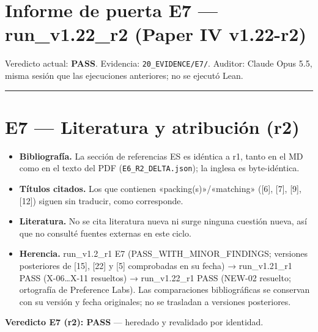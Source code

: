 \documentclass[
]{article}
\author{}
\date{}
\providecommand{\tightlist}{%
  \setlength{\itemsep}{0pt}\setlength{\parskip}{0pt}}
\begin{document}
\section{Informe de puerta E7 --- run\_v1.22\_r2 (Paper IV
v1.22-r2)}\label{informe-de-puerta-e7--run_v122_r2-paper-iv-v122-r2}

Veredicto actual: \textbf{PASS}. Evidencia: \texttt{20\_EVIDENCE/E7/}.
Auditor: Claude Opus 5.5, misma sesión que las ejecuciones anteriores;
no se ejecutó Lean.

\begin{center}\rule{0.5\linewidth}{0.5pt}\end{center}

\section{E7 --- Literatura y atribución
(r2)}\label{e7--literatura-y-atribuciuxf3n-r2}

\begin{itemize}
\tightlist
\item
  \textbf{Bibliografía.} La sección de referencias ES es idéntica a r1,
  tanto en el MD como en el texto del PDF (\texttt{E6\_R2\_DELTA.json});
  la inglesa es byte-idéntica.
\item
  \textbf{Títulos citados.} Los que contienen «packing(s)»/«matching»
  ({[}6{]}, {[}7{]}, {[}9{]}, {[}12{]}) siguen sin traducir, como
  corresponde.
\item
  \textbf{Literatura.} No se cita literatura nueva ni surge ninguna
  cuestión nueva, así que no consulté fuentes externas en este ciclo.
\item
  \textbf{Herencia.} run\_v1.2\_r1 E7 (PASS\_WITH\_MINOR\_FINDINGS;
  versiones posteriores de {[}15{]}, {[}22{]} y {[}5{]} comprobadas en
  su fecha) → run\_v1.21\_r1 PASS (X-06\ldots X-11 resueltos) →
  run\_v1.22\_r1 PASS (NEW-02 resuelto; ortografía de Preference Labs).
  Las comparaciones bibliográficas se conservan con su versión y fecha
  originales; no se trasladan a versiones posteriores.
\end{itemize}

\textbf{Veredicto E7 (r2): PASS} --- heredado y revalidado por
identidad.
\end{document}
